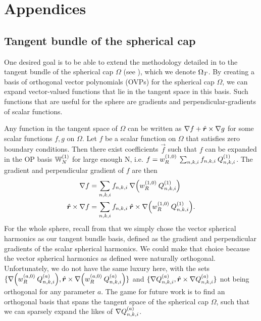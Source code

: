 
\appendix
\chapter*{Appendices}



\renewcommand{\thesection}{A}
\section{Tangent bundle of the spherical cap}\label{appendix:tangent}

One desired goal is to be able to extend the methodology detailed in  to the tangent bundle of the spherical cap $\Omega$ (see ), which we denote ${\Omega_T}$. By creating a basis of orthogonal vector polynomials (OVPs) for the spherical cap $\Omega$, we can expand vector-valued functions that lie in the tangent space in this basis. Such functions that are useful for the sphere are gradients and perpendicular-gradients of scalar functions.

Any function in the tangent space of $\Omega$ can be written as $\nabla f + \hat{\bm{r}} \times \nabla g$ for some scalar functions $f, g$ on $\Omega$. Let $f$ be a scalar function on $\Omega$ that satisfies zero boundary conditions. Then there exist coefficients $\vec{f}$ such that $f$ can be expanded in the OP basis $\mathbb{W}_N^{(1)}$ for large enough N, i.e. $f = w_R^{(1,0)} \: \sum_{n,k,i} f_{n,k,i} \: Q_{n,k,i}^{(1)}$. The gradient and perpendicular gradient of $f$ are then
\begin{align*}
	\nabla f &= \sum_{n,k,i} f_{n,k,i} \: \nabla \Big( w_R^{(1,0)} \: Q_{n,k,i}^{(1)} \Big) \\
	\hat{\bm{r}} \times \nabla f &= \sum_{n,k,i} f_{n,k,i} \: \hat{\bm{r}} \times \nabla \Big( w_R^{(1,0)} \: Q_{n,k,i}^{(1)} \Big).
\end{align*}
For the whole sphere, recall from  that we simply chose the vector spherical harmonics as our tangent bundle basis, defined as the gradient and perpendicular gradients of the scalar spherical harmonics. We could make that choice because the vector spherical harmonics as defined were naturally orthogonal. Unfortunately, we do not have the same luxury here, with the sets $\{ \nabla \Big( w_R^{(a,0)} \: Q_{n,k,i}^{(a)} \Big), \hat{\bm{r}} \times \nabla \Big( w_R^{(a,0)} \: Q_{n,k,i}^{(a)} \Big) \}$ and $\{ \nabla Q_{n,k,i}^{(a)}, \hat{\bm{r}} \times \nabla Q_{n,k,i}^{(a)} \}$ not being orthogonal for any parameter $a$. The game for future work is to find an orthogonal basis that spans the tangent space of the spherical cap $\Omega$, such that we can sparsely expand the likes of $\nabla Q_{n,k,i}^{(a)}$.




